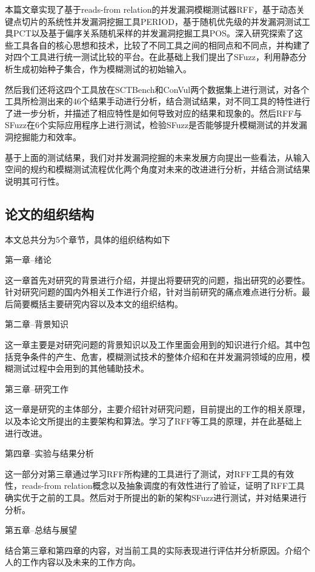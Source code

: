 本篇文章实现了基于reads-from relation的并发漏洞模糊测试器RFF，基于动态关键点切片的系统性并发漏洞挖掘工具PERIOD，基于随机优先级的并发漏洞测试工具PCT以及基于偏序关系随机采样的并发漏洞挖掘工具POS。深入研究探索了这些工具各自的核心思想和技术，比较了不同工具之间的相同点和不同点，并构建了对四个工具进行统一测试比较的平台。在此基础上我们提出了SFuzz，利用静态分析生成初始种子集合，作为模糊测试的初始输入。

然后我们还将这四个工具放在SCTBench和ConVul两个数据集上进行测试，对各个工具所检测出来的46个结果手动进行分析，结合测试结果，对不同工具的特性进行了进一步分析，并描述了相应特性是如何导致对应的结果和现象的。然后RFF与SFuzz在6个实际应用程序上进行测试，检验SFuzz是否能够提升模糊测试的并发漏洞挖掘能力和效率。

基于上面的测试结果，我们对并发漏洞挖掘的未来发展方向提出一些看法，从输入空间的规约和模糊测试流程优化两个角度对未来的改进进行分析，并结合测试结果说明其可行性。

\subsection{论文的组织结构}

本文总共分为5个章节，具体的组织结构如下

第一章--绪论\par
这一章首先对研究的背景进行介绍，并提出将要研究的问题，指出研究的必要性。针对研究问题的国内外相关工作进行介绍，针对当前研究的痛点难点进行分析。最后简要概括主要研究内容以及本文的组织结构。\par\par
第二章--背景知识\par
这一章主要是对研究问题的背景知识以及工作里面会用到的知识进行介绍。其中包括竞争条件的产生、危害，模糊测试技术的整体介绍和在并发漏洞领域的应用，模糊测试过程中会用到的其他辅助技术。\par\par
第三章--研究工作\par
这一章是研究的主体部分，主要介绍针对研究问题，目前提出的工作的相关原理，以及本论文所提出的主要架构和算法。学习了RFF等工具的原理，并在此基础上进行改进。\par\par
第四章--实验与结果分析\par
这一部分对第三章通过学习RFF所构建的工具进行了测试，对RFF工具的有效性，reads-from relation概念以及抽象调度的有效性进行了验证，证明了RFF工具确实优于之前的工具。然后对于所提出的新的架构SFuzz进行测试，并对结果进行分析。\par\par
第五章--总结与展望\par
结合第三章和第四章的内容，对当前工具的实际表现进行评估并分析原因。介绍个人的工作内容以及未来的工作方向。

